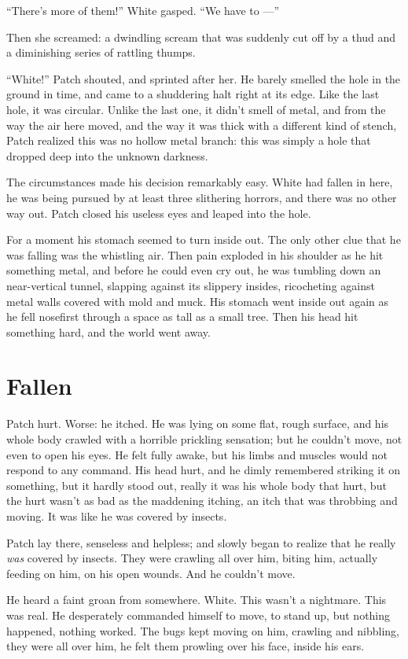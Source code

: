 \documentclass[ebook,oneside,openany,17pt]{memoir}
\renewcommand{\thechapter}{\Roman{chapter}}
\newcounter{sections}
\newcommand{\sections}[1]{%
  \section*{#1}
  \addtocounter{sections}{1}%
  \pdfbookmark[1]{#1}{section.\thechapter.\thesections}}
\begin{document}
“There’s more of them!” White gasped. “We have to —”

Then she screamed: a dwindling scream that was suddenly cut off by a
thud and a diminishing series of rattling thumps.

“White!” Patch shouted, and sprinted after her. He barely smelled the
hole in the ground in time, and came to a shuddering halt right at its
edge. Like the last hole, it was circular. Unlike the last one, it
didn’t smell of metal, and from the way the air here moved, and the
way it was thick with a different kind of stench, Patch realized this
was no hollow metal branch: this was simply a hole that dropped deep
into the unknown darkness.

The circumstances made his decision remarkably easy. White had fallen
in here, he was being pursued by at least three slithering horrors,
and there was no other way out. Patch closed his useless eyes and
leaped into the hole.

For a moment his stomach seemed to turn inside out. The only other
clue that he was falling was the whistling air. Then pain exploded in
his shoulder as he hit something metal, and before he could even cry
out, he was tumbling down an near-vertical tunnel, slapping against
its slippery insides, ricocheting against metal walls covered with
mold and muck. His stomach went inside out again as he fell nosefirst
through a space as tall as a small tree. Then his head hit something
hard, and the world went away.


\sections{Fallen}

Patch hurt. Worse: he itched. He was lying on some flat, rough
surface, and his whole body crawled with a horrible prickling
sensation; but he couldn’t move, not even to open his eyes. He felt
fully awake, but his limbs and muscles would not respond to any
command. His head hurt, and he dimly remembered striking it on
something, but it hardly stood out, really it was his whole body that
hurt, but the hurt wasn’t as bad as the maddening itching, an itch
that was throbbing and moving. It was like he was covered by insects.

Patch lay there, senseless and helpless; and slowly began to realize
that he really \emph{was} covered by insects. They were crawling all
over him, biting him, actually feeding on him, on his open wounds. And
he couldn’t move.

He heard a faint groan from somewhere. White. This wasn’t a
nightmare. This was real. He desperately commanded himself to move, to
stand up, but nothing happened, nothing worked. The bugs kept moving
on him, crawling and nibbling, they were all over him, he felt them
prowling over his face, inside his ears.
\end{document}

